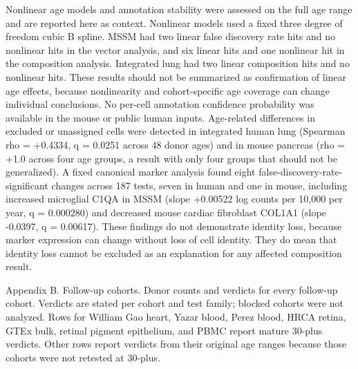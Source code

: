 \documentclass[11pt]{article}
\begin{document}
Nonlinear age models and annotation stability were assessed on the full age range and are reported here as context. Nonlinear models used a fixed three degree of freedom cubic B spline. MSSM had two linear false discovery rate hits and no nonlinear hits in the vector analysis, and six linear hits and one nonlinear hit in the composition analysis. Integrated lung had two linear composition hits and no nonlinear hits. These results should not be summarized as confirmation of linear age effects, because nonlinearity and cohort-specific age coverage can change individual conclusions. No per-cell annotation confidence probability was available in the mouse or public human inputs. Age-related differences in excluded or unassigned cells were detected in integrated human lung (Spearman rho = +0.4334, q = 0.0251 across 48 donor ages) and in mouse pancreas (rho = +1.0 across four age groups, a result with only four groups that should not be generalized). A fixed canonical marker analysis found eight false-discovery-rate-significant changes across 187 tests, seven in human and one in mouse, including increased microglial C1QA in MSSM (slope +0.00522 log counts per 10,000 per year, q = 0.000280) and decreased mouse cardiac fibroblast COL1A1 (slope -0.0397, q = 0.00617). These findings do not demonstrate identity loss, because marker expression can change without loss of cell identity. They do mean that identity loss cannot be excluded as an explanation for any affected composition result.

Appendix B. Follow-up cohorts. Donor counts and verdicts for every follow-up cohort. Verdicts are stated per cohort and test family; blocked cohorts were not analyzed. Rows for William Gao heart, Yazar blood, Perez blood, HRCA retina, GTEx bulk, retinal pigment epithelium, and PBMC report mature 30-plus verdicts. Other rows report verdicts from their original age ranges because those cohorts were not retested at 30-plus.
\end{document}
